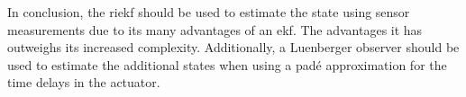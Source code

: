 In conclusion, the \gls{riekf} should be used to estimate the state using sensor measurements due to its many advantages of an \gls{ekf}. 
The advantages it has outweighs its increased complexity.
Additionally, a Luenberger observer should be used to estimate the additional states when using a padé approximation for the time delays in the actuator.